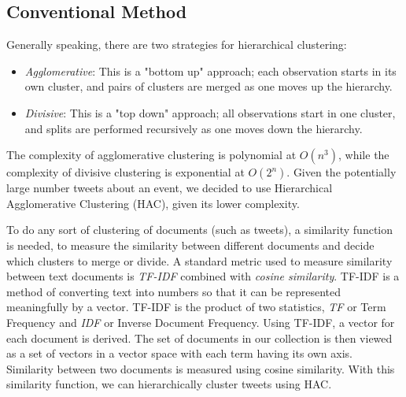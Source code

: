 \documentclass[letterpaper]{article}
\begin{document}
\subsection{Conventional Method}
Generally speaking, there are two strategies for hierarchical clustering: %
\begin{itemize}
\item \emph{Agglomerative}: This is a "bottom up" approach; each observation starts in its own cluster, and pairs of clusters are merged as one moves up the hierarchy.
\item \emph{Divisive}: This is a "top down" approach; all observations start in one cluster, and splits are performed recursively as one moves down the hierarchy.
\end{itemize}

The complexity of agglomerative clustering is polynomial at $O(n^{3})$, while the complexity of divisive clustering is exponential at $O(2^{n})$. Given the potentially large number tweets about an event, we decided to use Hierarchical Agglomerative Clustering (HAC), given its lower complexity.

To do any sort of clustering of documents (such as tweets), a similarity function is needed, to measure the similarity between different documents and decide which clusters to merge or divide. A standard metric used to measure similarity between text documents is \emph{TF-IDF} combined with \emph{cosine similarity}. TF-IDF is a method of converting text into numbers so that it can be represented meaningfully by a vector. TF-IDF is the product of two statistics, \emph{TF} or Term Frequency and \emph{IDF} or Inverse Document Frequency.
Using TF-IDF, a vector for each document is derived. The set of documents in our collection is then viewed as a set of vectors in a vector space with each term  having its own axis. Similarity between two documents is measured using cosine similarity. With this similarity function, we can hierarchically cluster tweets using HAC. %
\end{document}
